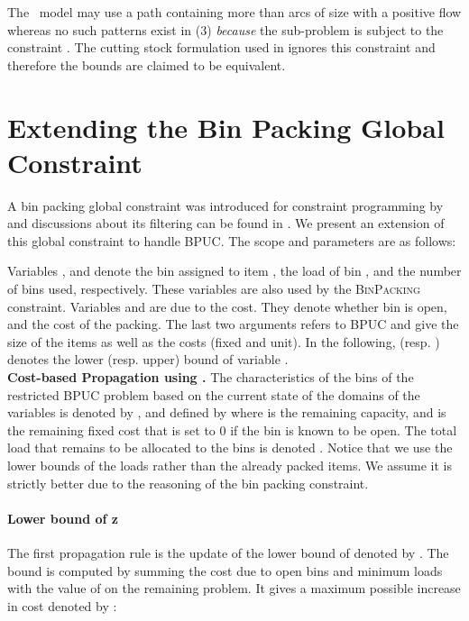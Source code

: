 The \arcflow\ model  may use a path containing more than  arcs of size  with a positive flow whereas no such patterns exist in (3) \textit{because} the sub-problem is subject to the constraint . The cutting stock formulation used in \cite{Carvalho99}  ignores this constraint and therefore the bounds are claimed to be equivalent.






\section{Extending the Bin Packing Global Constraint}

A bin packing global constraint was introduced for constraint programming  by \cite{DBLP:conf/cp/Shaw04} and discussions about its filtering can be found in \cite{Schaus2009,DBLP:conf/aaai/ReginR11}. We present an  extension of this global constraint to handle BPUC. The scope and parameters are as follows:

Variables ,  and  denote  the bin assigned to item , the load of bin , and the number of bins used, respectively. These  variables are also used by the \textsc{BinPacking} constraint. Variables  and  are due to the cost. They denote whether bin  is open, and the cost of the packing. The last two arguments refers to BPUC and give the size of the items as well as the costs (fixed and unit). In the following,   (resp. ) denotes the lower (resp. upper) bound of variable .   \\

\noindent\textbf{Cost-based Propagation using .}
The characteristics of the bins of the restricted  BPUC  problem  based on the current state of the domains of the variables is  denoted by , and defined by  where  is the remaining capacity, and  is the remaining fixed cost  that is set to 0 if the bin is known to be open. The total load that remains to be allocated to the bins is denoted . Notice that we use the lower bounds of the loads rather than the already packed items. We assume it is strictly better due to the reasoning of the bin packing constraint.

\paragraph{Lower bound of z} 
The first propagation rule is the update of the lower bound   of  denoted by . The bound is computed by summing the cost due to open bins and minimum loads with the value of  on the remaining problem. 
It gives a maximum possible increase in cost denoted by :



